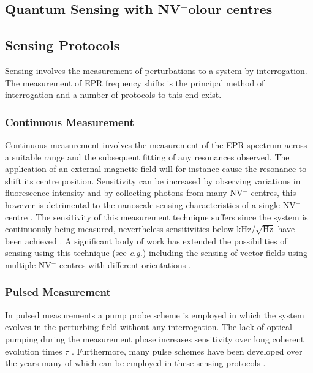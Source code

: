 \documentclass[12pt]{article}
\begin{document}
\subsection{Quantum Sensing with NV\texorpdfstring{$^-$} colour centres}

\subsection{Sensing Protocols}
Sensing involves the measurement of perturbations to a system by interrogation. The measurement of EPR frequency shifts is the principal method of interrogation and a number of protocols to this end exist. 

\subsubsection{Continuous Measurement}
Continuous measurement involves the measurement of the EPR spectrum across a suitable range and the subsequent fitting of any resonances observed. The application of an external magnetic field will for instance cause the resonance to shift its centre position. Sensitivity can be increased by observing variations in fluorescence intensity and by collecting photons from many NV$^-$ centres, this however is detrimental to the nanoscale sensing characteristics of a single NV$^-$ centre \cite{schirhagl2014nitrogen}. The sensitivity of this measurement technique suffers since the system is continuously being measured, nevertheless sensitivities below kHz/$\sqrt{\textrm{Hz}}$ have been achieved \cite{acosta2010broadband}. A significant body of work has extended the possibilities of sensing using this technique (see \textit{e.g.}\cite{haberle2013high,schoenfeld2011real}) including the sensing of vector fields using multiple NV$^-$ centres with different orientations \cite{maertz2010vector}.

\subsubsection{Pulsed Measurement}
In pulsed measurements a pump probe scheme is employed in which the system evolves in the perturbing field without any interrogation. The lack of optical pumping during the measurement phase increases sensitivity over long coherent evolution times $\tau$ \cite{maze2008nanoscale}. Furthermore, many pulse schemes have been developed over the years many of which can be employed in these sensing protocols \cite{schirhagl2014nitrogen}.
\end{document}
